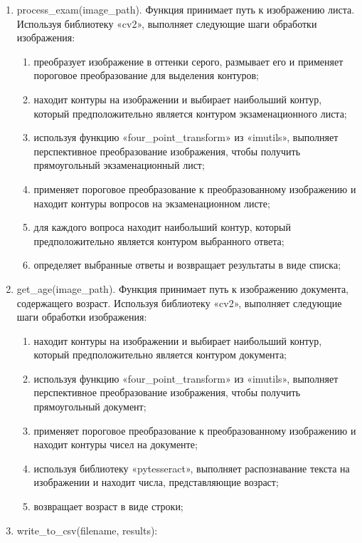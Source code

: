 \begin{enumerate}
    \item process\_exam(image\_path). Функция принимает путь к изображению листа. Используя библиотеку «cv2», выполняет следующие шаги обработки изображения:
        \begin{enumerate}
            \item преобразует изображение в оттенки серого, размывает его и применяет пороговое преобразование для выделения контуров;
            \item находит контуры на изображении и выбирает наибольший контур, который предположительно является контуром экзаменационного листа;
            \item используя функцию «four\_point\_transform» из «imutils», выполняет перспективное преобразование изображения, чтобы получить прямоугольный экзаменационный лист;
            \item применяет пороговое преобразование к преобразованному изображению и находит контуры вопросов на экзаменационном листе;
            \item для каждого вопроса находит наибольший контур, который предположительно является контуром выбранного ответа;
            \item определяет выбранные ответы и возвращает результаты в виде списка;
        \end{enumerate}
    \item get\_age(image\_path). Функция принимает путь к изображению документа, содержащего возраст. Используя библиотеку «cv2», выполняет следующие шаги обработки изображения:
        \begin{enumerate}
            \item находит контуры на изображении и выбирает наибольший контур, который предположительно является контуром документа;
            \item используя функцию «four\_point\_transform» из «imutils», выполняет перспективное преобразование изображения, чтобы получить прямоугольный документ;
            \item применяет пороговое преобразование к преобразованному изображению и находит контуры чисел на документе;
            \item используя библиотеку «pytesseract», выполняет распознавание текста на изображении и находит числа, представляющие возраст;
            \item возвращает возраст в виде строки;
        \end{enumerate}
    \item write\_to\_csv(filename, results):

\end{enumerate}
